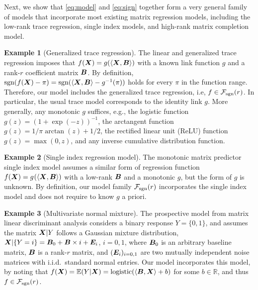 \documentclass[aos]{imsart}
\theoremstyle{definition}
\newtheorem{example}{Example}
\def\sign{\textup{sgn}}
\def\caliF{\tF_{\textup{sgn}}}
\begin{document}
Next, we show that \eqref{eq:model} and \eqref{eq:sign} together form a very general family of models that incorporate most existing matrix regression models, including the low-rank trace regression, single index models, and high-rank matrix completion model. 

\begin{example}[Generalized trace regression] The linear and generalized trace regression \cite{zhou2014regularized, wang2017generalized, fan2019generalized} imposes that $f(\bm X)=g(\langle \bm X, \bm B \rangle)$ with a known link function $g$ and a rank-$r$ coefficient matrix $\bm B$. By definition, $\sign(f(\mX)-\pi)=\sign(\langle \mX, \mB \rangle -g^{-1}(\pi))$ holds for every $\pi$ in the function range. Therefore, our model includes the generalized trace regression, i.e, $f \in \caliF(r)$. In particular, the usual trace model corresponds to the identity link $g$. More generally, any monotonic $g$ suffices, e.g., the logistic function $g(z)=(1+\exp(-z))^{-1}$, the arctangent function $g(z)={1/\pi}\arctan(z)+{1/2}$, the rectified linear unit (ReLU) function $g(z)=\max(0,z)$, and any inverse cumulative distribution function. 
\end{example}

\begin{example}[Single index regression model] 
The monotonic matrix predictor single index model \citep{balabdaoui2019least,ganti2017learning} assumes a similar form of regression function $f(\bm X)=g^{}(\langle \bm X, \bm B\rangle)$ with a low-rank $\bm B$ and a monotonic $g$, but the form of $g$ is unknown. By definition, our model family $\caliF(r)$ incorporates the single index model and does not require to know $g$ a priori. 
\end{example}

\begin{example}[Multivariate normal mixture]
The prospective model from matrix linear discriminant analysis \citep{hu2020matrix} considers a binary response $Y=\{0,1\}$, and assumes the matrix $\bm X|Y$ follows a Gaussian mixture distribution, $\bm X|\{Y=i\} = \bm B_0 + \bm B\times i + \bm{E}_i$, $i=0,1$, where $\bm B_0$ is an arbitrary baseline matrix, $\bm B$ is a rank-$r$ matrix, and $(\bm{E}_i)_{i=0,1}$ are two mutually independent noise matrices with i.i.d.\ standard normal entries. Our model incorporates this model, by noting that $f(\bm X)=\mathbb{E}(Y|\bm X)=\text{logistic}(\langle \bm B, \bm X \rangle+b)$ for some $b\in\mathbb{R}$, and thus $f\in \caliF(r)$. 
\end{example}
\end{document}
